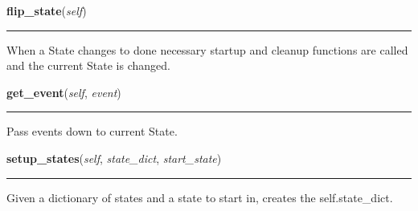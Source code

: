     \vspace{0.5ex}

\hspace{.8\funcindent}\begin{boxedminipage}{\funcwidth}

    \raggedright \textbf{flip\_state}(\textit{self})

    \vspace{-1.5ex}

    \rule{\textwidth}{0.5\fboxrule}
\setlength{\parskip}{2ex}
    When a State changes to done necessary startup and cleanup functions 
    are called and the current State is changed.

\setlength{\parskip}{1ex}
    \end{boxedminipage}

    \label{state_machine:StateMachine:get_event}

    \vspace{0.5ex}

\hspace{.8\funcindent}\begin{boxedminipage}{\funcwidth}

    \raggedright \textbf{get\_event}(\textit{self}, \textit{event})

    \vspace{-1.5ex}

    \rule{\textwidth}{0.5\fboxrule}
\setlength{\parskip}{2ex}
    Pass events down to current State.

\setlength{\parskip}{1ex}
    \end{boxedminipage}

    \label{state_machine:StateMachine:setup_states}

    \vspace{0.5ex}

\hspace{.8\funcindent}\begin{boxedminipage}{\funcwidth}

    \raggedright \textbf{setup\_states}(\textit{self}, \textit{state\_dict}, \textit{start\_state})

    \vspace{-1.5ex}

    \rule{\textwidth}{0.5\fboxrule}
\setlength{\parskip}{2ex}
    Given a dictionary of states and a state to start in, creates the 
    self.state\_dict.

\setlength{\parskip}{1ex}
    \end{boxedminipage}

